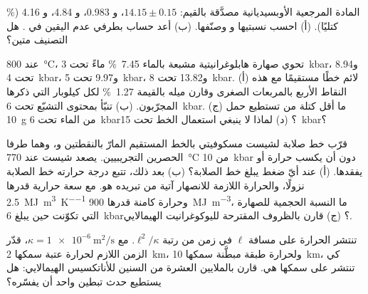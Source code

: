 \begin{exercise}[$\star\star$]\label{exo:b2:crustal-melting:8}
المادة المرجعية الأوبسيديانية  مصدَّقة بالقيم: 
$14.15 \pm 0.15$، و 0.983، و 4.84، و 4.16 (\unit{\percent}
كتليًا). (أ) احسب نسبتيها  و وصنّفها. (ب) أعد حساب  بطرفي
عدم اليقين في . هل التصنيف متين؟
\end{exercise}

\begin{exercise}[$\star\star$]\label{exo:b2:crustal-melting:9}
عند \qty{800}{\celsius}، تحوي صهارة هابلوغرانيتية مشبعة بالماء \qty{7.45}{\percent}
ماءً تحت \qty{3}{kbar}، و8.94 تحت \qty{4}{kbar}، و9.97 تحت \qty{5}{kbar}، و13.82 تحت
\qty{8}{kbar}. (أ) لائم خطًا مستقيمًا مع هذه النقاط الأربع بالمربعات الصغرى وقارن
ميله بالقيمة \qty{1.27}{\percent} لكل كيلوبار التي ذكرها المجرّبون.
(ب) تنبّأ بمحتوى التشبّع تحت \qty{6}{kbar}. (ج) ما أقل كتلة من 
تستطيع حمل \qty{10}{\gram} من الماء تحت \qty{6}{kbar}؟ (د) لماذا لا ينبغي استعمال الخط
تحت \qty{15}{kbar}؟
\end{exercise}

\begin{exercise}[$\star\star\star$]\label{exo:b2:crustal-melting:10}
قرّب خط صلابة  لشيست مسكوفيتي بالخط المستقيم
المارّ بالنقطتين  و،
وهما طرفا الحصرين التجريبيين. يصعد شيست عند \qty{770}{\celsius} من
\qty{10}{kbar} دون أن يكسب حرارة أو يفقدها. (أ) عند أيّ ضغط يبلغ
خط الصلابة؟ (ب) بعد ذلك، تتبع درجة حرارته خط الصلابة نزولًا، والحرارة اللازمة للانصهار آتية
من تبريده هو. مع سعة حرارية قدرها \qty{2.5}{\mega\joule\per\cubic\metre\per\kelvin}
وحرارة كامنة قدرها \qty{900}{\mega\joule\per\cubic\metre}، ما النسبة الحجمية للصهارة التي
تكوّنت حين يبلغ \qty{6}{kbar}؟ (ج) قارن بالظروف المقترحة
لليوكوغرانيت الهيمالايي.
\end{exercise}

\begin{exercise}[$\star\star\star$]\label{exo:b2:crustal-melting:11}
تنتشر الحرارة على مسافة $\ell$ في زمن من رتبة $\ell^2/\kappa$. مع
$\kappa = \qty{1e-6}{\square\metre\per\second}$، قدّر الزمن اللازم لحرارة
عتبة سمكها \qty{2}{km}، ولحرارة طبقة مبطَّنة سمكها \qty{10}{km}، كي تنتشر على
سمكها هي. قارن بالملايين العشرة من السنين للأناتكسيس الهيمالايي: هل يستطيع
حدث تبطين واحد أن يفسّره؟
\end{exercise}

